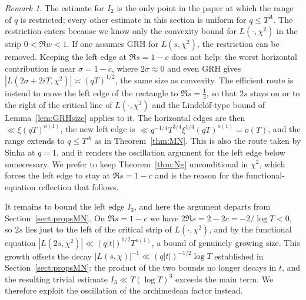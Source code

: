 \documentclass[12pt,a4paper,reqno]{amsart}
\theoremstyle{remark}
\newtheorem*{remark}{Remark}
\numberwithin{equation}{section}
\begin{document}
\begin{remark}
The estimate for $I_2$ is the only point in the paper at which the range of $q$ is restricted; every other estimate in this section is uniform for $q\le T^{A}$. The restriction enters because we know only the convexity bound for $L(\cdot,\chi^2)$ in the strip $0<\Re w<1$. If one assumes GRH for $L(s,\chi^2)$, the restriction can be removed. Keeping the left edge at $\Re s=1-c$ does not help: the worst horizontal contribution is near $\sigma=1-c$, where $2\sigma\approx0$ and even GRH gives $|L(2\sigma+2iT,\chi^2)|\asymp(qT)^{1/2}$, the same size as convexity. The efficient route is instead to move the left edge of the rectangle to $\Re s=\tfrac14$, so that $2s$ stays on or to the right of the critical line of $L(\cdot,\chi^2)$ and the Lindel\"of-type bound of Lemma~\ref{lem:GRHsize} applies to it. The horizontal edges are then $\ll\xi(qT)^{o(1)}$, the new left edge is $\ll q^{-1/4}T^{3/4}\xi^{1/4}(qT)^{o(1)}=o(T)$, and the range extends to $q\le T^{A}$ as in Theorem~\ref{thm:MN}. This is also the route taken by Sinha \cite{SinhaThesis} at $q=1$, and it renders the oscillation argument for the left edge below unnecessary. We prefer to keep Theorem~\ref{thm:Ng} unconditional in $\chi^2$, which forces the left edge to stay at $\Re s=1-c$ and is the reason for the functional-equation reflection that follows.
\end{remark}

It remains to bound the left edge $I_3$, and here the argument departs from Section~\ref{sect:propsMN}. On $\Re s=1-c$ we have $2\Re s=2-2c=-2/\log T<0$, so $2s$ lies just to the left of the critical strip of $L(\cdot,\chi^2)$, and by the functional equation $|L(2s,\chi^2)|\ll(q|t|)^{1/2}T^{o(1)}$, a bound of genuinely growing size. This growth offsets the decay $|L(s,\chi)|^{-1}\ll(q|t|)^{-1/2}\log T$ established in Section~\ref{sect:propsMN}: the product of the two bounds no longer decays in $t$, and the resulting trivial estimate $I_3\ll T(\log T)^3$ exceeds the main term. We therefore exploit the oscillation of the archimedean factor instead.
\end{document}
